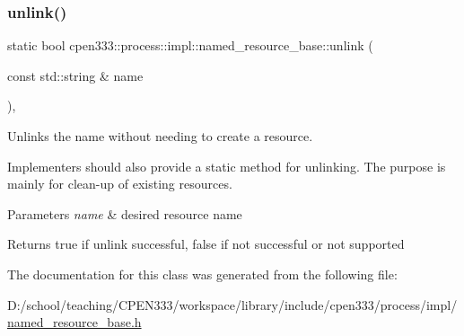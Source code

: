 \mbox{\label{classcpen333_1_1process_1_1impl_1_1named__resource__base_a47a1396cf7c8210e76431a4ba4725146}} 
\subsubsection{\texorpdfstring{unlink()}{unlink()}\hspace{0.1cm}{\footnotesize\ttfamily [2/2]}}
{\footnotesize\ttfamily static bool cpen333\+::process\+::impl\+::named\+\_\+resource\+\_\+base\+::unlink (\begin{DoxyParamCaption}\item[{const std\+::string \&}]{name }\end{DoxyParamCaption})\hspace{0.3cm}{\ttfamily [inline]}, {\ttfamily [static]}}



Unlinks the name without needing to create a resource. 

Implementers should also provide a static method for unlinking. The purpose is mainly for clean-\/up of existing resources.


\begin{DoxyParams}{Parameters}
{\em name} & desired resource name \\
\hline
\end{DoxyParams}
\begin{DoxyReturn}{Returns}
{\ttfamily true} if unlink successful, {\ttfamily false} if not successful or not supported 
\end{DoxyReturn}


The documentation for this class was generated from the following file\+:\begin{DoxyCompactItemize}
\item 
D\+:/school/teaching/\+C\+P\+E\+N333/workspace/library/include/cpen333/process/impl/\hyperlink{named__resource__base_8h}{named\+\_\+resource\+\_\+base.\+h}\end{DoxyCompactItemize}
